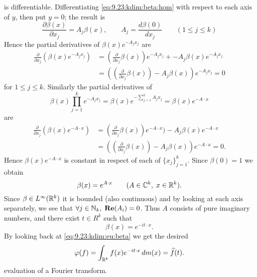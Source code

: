 \begin{enumerate}
\begin{thmproof}
is differentiable.
Differentiating \eqref{eq:9.23:kdim:beta:hom}
with respect to each axis of $y$, then put \(y=0\);
the result is
\begin{equation} \label{eq:9.23:kdim:diffeq}
\frac{\partial\beta(x)}{\partial x_j} = A_j\beta(x), 
\qquad A_j = \frac{d\beta(0)}{dx_j}
\qquad (1\leq j \leq k)
\end{equation}
Hence the partial derivatives of \(\beta(x)e^{-A_jx_j}\) are
\begin{align*}
\frac{\partial}{\partial x_j} \left(\beta(x)e^{-A_jx_j}\right)
&= \left(\frac{\partial}{\partial x_j} \beta(x)\right)e^{-A_jx_j}
   + -A_j\beta(x)e^{-A_jx_j} \\
&= \left(\left(\frac{\partial}{\partial x_j} \beta(x) 
              \right) - A_j\beta(x)\right)e^{-A_jx_j}
= 0
\end{align*}
for \(1\leq j \leq k\). Similarly the partial derivatives of
\begin{equation*}
\beta(x)\prod_{j=1}^ke^{-A_jx_j}
= \beta(x)e^{-\sum_{j=1}^k A_jx_j} = \beta(x)e^{-A\cdot x}
\end{equation*}
are
\begin{align*}
\frac{\partial}{\partial x_j} \left(\beta(x)e^{-A\cdot x}\right)
&= \left(\frac{\partial}{\partial x_j} \beta(x)\right)e^{-A\cdot x})
   -A_j \beta(x)e^{-A\cdot x} \\
&= \left(\left(\frac{\partial}{\partial x_j} \beta(x)\right)
        -A_j \beta(x)\right)e^{-A\cdot x}
= 0.
\end{align*}
Hence \(\beta(x)e^{-A\cdot x}\)
is constant in respect of each of \(\{x_j\}_{j=1}^k\).
Since \(\beta(0)=1\) we obtain
\begin{equation*}
\beta(x) = e^{A\cdot x} \qquad (A\in\mathbb{C}^k,\; x\in\mathbb{R}^k).
\end{equation*}
Since \(\beta\in L^\infty(\mathbb{R}^k)\) it is bounded (also continuous)
and by looking at each axis separately, we see that
\(\forall j\in\mathbb{N}_k,\;\mathop{\bf Re}\nolimits(A_i)=0\). Thus $A$ consists
of pure imaginary numbers, and there exist \(t\in R^k\)
such that 
\begin{equation*}
\beta(x) = e^{-it\cdot x}.
\end{equation*}
By looking back  at \eqref{eq:9.23:kdim:eu:beta} we get the desired
\begin{equation*}
\varphi(f) = \int_{\mathbb{R}^k}f(x)e^{-it\cdot x}\,dm(x) = \widehat{f}(t).
\end{equation*}
evaluation of a Fourier transform.
\end{thmproof}



\end{enumerate}
